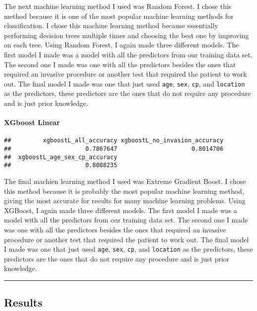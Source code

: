 \documentclass[
]{article}
\begin{document}
The next machine learning method I used was Random Forest. I chose this
method because it is one of the most popular machine learning methods
for classification. I chose this machine learning method because
essentially performing decision trees multiple times and choosing the
best one by improving on each tree. Using Random Forest, I again made
three different models. The first model I made was a model with all the
predictors from our training data set. The second one I made was one
with all the predictors besides the ones that required an invasive
procedure or another test that required the patient to work out. The
final model I made was one that just used \texttt{age}, \texttt{sex},
\texttt{cp}, and \texttt{location} as the predictors, these predictors
are the ones that do not require any procedure and is just prior
knowledge.

\hypertarget{xgboost-linear}{%
\paragraph{XGboost Linear}\label{xgboost-linear}}

\begin{verbatim}
##         xgboostL_all_accuracy xgboostL_no_invasion_accuracy 
##                     0.7867647                     0.8014706 
##  xgboostL_age_sex_cp_accuracy 
##                     0.8088235
\end{verbatim}

The final machien learning method I used was Extreme Gradient Boost. I
chose this method because it is probably the most popular machine
learning method, giving the most accurate for results for many machine
learning problems. Using XGBoost, I again made three different models.
The first model I made was a model with all the predictors from our
training data set. The second one I made was one with all the predictors
besides the ones that required an invasive procedure or another test
that required the patient to work out. The final model I made was one
that just used \texttt{age}, \texttt{sex}, \texttt{cp}, and
\texttt{location} as the predictors, these predictors are the ones that
do not require any procedure and is just prior knowledge.

\begin{center}\rule{0.5\linewidth}{0.5pt}\end{center}

\hypertarget{results}{%
\subsection{Results}\label{results}}
\end{document}
